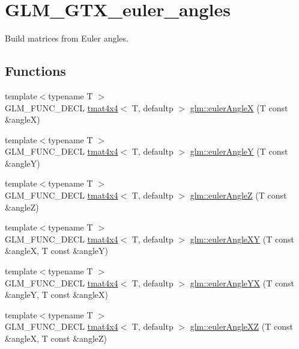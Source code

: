 \hypertarget{group__gtx__euler__angles}{}\section{G\+L\+M\+\_\+\+G\+T\+X\+\_\+euler\+\_\+angles}
\label{group__gtx__euler__angles}


Build matrices from Euler angles.  


\subsection*{Functions}
\begin{DoxyCompactItemize}
\item 
{\footnotesize template$<$typename T $>$ }\\G\+L\+M\+\_\+\+F\+U\+N\+C\+\_\+\+D\+E\+CL \hyperlink{structglm_1_1tmat4x4}{tmat4x4}$<$ T, defaultp $>$ \hyperlink{group__gtx__euler__angles_ga82cd3b8a04943f1a0d1a562aff358dc8}{glm\+::euler\+AngleX} (T const \&angleX)
\item 
{\footnotesize template$<$typename T $>$ }\\G\+L\+M\+\_\+\+F\+U\+N\+C\+\_\+\+D\+E\+CL \hyperlink{structglm_1_1tmat4x4}{tmat4x4}$<$ T, defaultp $>$ \hyperlink{group__gtx__euler__angles_gaeb193af1184bdf39c23636d756e1ff33}{glm\+::euler\+AngleY} (T const \&angleY)
\item 
{\footnotesize template$<$typename T $>$ }\\G\+L\+M\+\_\+\+F\+U\+N\+C\+\_\+\+D\+E\+CL \hyperlink{structglm_1_1tmat4x4}{tmat4x4}$<$ T, defaultp $>$ \hyperlink{group__gtx__euler__angles_gab59c4fe7f735568255cc19fddd3ddfcd}{glm\+::euler\+AngleZ} (T const \&angleZ)
\item 
{\footnotesize template$<$typename T $>$ }\\G\+L\+M\+\_\+\+F\+U\+N\+C\+\_\+\+D\+E\+CL \hyperlink{structglm_1_1tmat4x4}{tmat4x4}$<$ T, defaultp $>$ \hyperlink{group__gtx__euler__angles_ga8bf84f92ca976a7f50dbe4b30ceb72dd}{glm\+::euler\+Angle\+XY} (T const \&angleX, T const \&angleY)
\item 
{\footnotesize template$<$typename T $>$ }\\G\+L\+M\+\_\+\+F\+U\+N\+C\+\_\+\+D\+E\+CL \hyperlink{structglm_1_1tmat4x4}{tmat4x4}$<$ T, defaultp $>$ \hyperlink{group__gtx__euler__angles_gafdd02f9a37511190962119adef5c1c25}{glm\+::euler\+Angle\+YX} (T const \&angleY, T const \&angleX)
\item 
{\footnotesize template$<$typename T $>$ }\\G\+L\+M\+\_\+\+F\+U\+N\+C\+\_\+\+D\+E\+CL \hyperlink{structglm_1_1tmat4x4}{tmat4x4}$<$ T, defaultp $>$ \hyperlink{group__gtx__euler__angles_gab2d7dc94b9a7519d741aaa208c7a335b}{glm\+::euler\+Angle\+XZ} (T const \&angleX, T const \&angleZ)

\end{DoxyCompactItemize}
